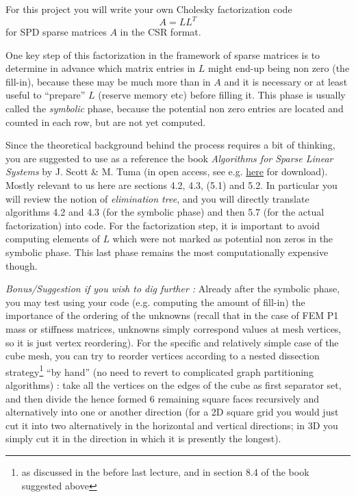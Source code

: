 \documentclass[11pt]{article}
\begin{document}
For this project you will write your own Cholesky factorization code  
$$
A = LL^T
$$
for SPD sparse matrices $A$ in the CSR format. 

One key step of this factorization in the framework of sparse matrices is to
determine in advance which 
matrix entries in $L$ might end-up being non zero (the fill-in), because these may be
much more than in $A$ and it is necessary or at least useful to ``prepare'' $L$ (reserve memory
etc) before filling it. This phase is usually called the {\it symbolic} phase, because 
the potential non zero entries are located and counted in each row, but are not
yet computed.

Since the theoretical background behind the process requires a bit of thinking, 
you are suggested to use as a reference the book {\it Algorithms for Sparse 
Linear Systems} by J. Scott \& M. Tuma (in open access, see e.g. 
\href{https://link.springer.com/book/10.1007/978-3-031-25820-6}{here} for
download). Mostly relevant to us here are sections 4.2, 4.3, (5.1) and 5.2. 
In particular you will review the notion of {\it elimination tree}, and you 
will directly translate algorithms 4.2 and 4.3 (for the symbolic phase) and 
then 5.7 (for the actual factorization) into code. For the factorization step,
it is important to avoid computing elements of $L$ which were not marked as
potential non zeros in the symbolic phase. This last phase remains the most
computationally expensive though.


{\it Bonus/Suggestion if you wish to dig further :} 
Already after the symbolic phase, you may test using your code (e.g. computing the amount of
fill-in) the importance of the ordering of the unknowns 
(recall that in the case of FEM P1 mass or stiffness matrices, unknowns simply
correspond values at mesh vertices, so it is just vertex reordering). 
For the specific and relatively simple case of the cube mesh, you can try to reorder vertices according to a nested
dissection strategy\footnote{as discussed in the before last lecture, and in section 8.4
of the book suggested above} ``by hand'' (no need to revert to complicated graph partitioning
algorithms) : take all the vertices on the edges of the cube
as first separator set, and then divide the hence formed 6 remaining 
square faces recursively and alternatively into one or another direction (for a 2D square
grid you would just cut it into two alternatively in the horizontal and vertical
directions; in 3D you simply cut it in the direction in which it is presently the
longest). 
\end{document}
